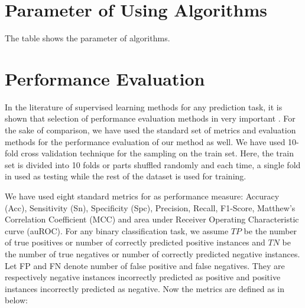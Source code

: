 \section{Parameter of Using Algorithms}
The table shows the parameter of algorithms.
\begin{table}[htbp]
\caption[Parameter of Algorithm]{Parameter of Algorithm }
\centering
\footnotesize
{}
\end{table}

\section{Performance Evaluation}
In the literature of supervised learning methods for any prediction task, it is shown that selection of performance evaluation methods in very important \cite{chou2011some}. For the sake of comparison, we have used the standard set of metrics and evaluation methods for the performance evaluation of our method as well. We have used 10-fold cross validation technique for the sampling on the train set. Here, the train set is divided into 10 folds or parts shuffled randomly and each time, a single fold in used as testing while the rest of the dataset is used for training. 

We have used eight standard metrics for as performance measure: Accuracy (Acc), Sensitivity (Sn), Specificity (Spc), Precision, Recall, F1-Score, Matthew's Correlation Coefficient (MCC) and area under Receiver Operating Characteristic curve (auROC). For any binary classification task, we assume $TP$ be the number of true positives or number of correctly predicted positive instances and $TN$ be the number of true negatives or number of correctly predicted negative instances. Let FP and FN denote number of false positive and false negatives. They are respectively negative instances incorrectly predicted as positive and  positive instances incorrectly predicted as negative. Now the metrics are defined as in below:    

